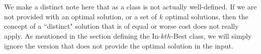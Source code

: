 \section{\inbk}
We make a distinct note here that \inbk{} as a class is not actually well-defined. If we are not provided with an optimal solution, or a set of $k$ optimal solutions, then the concept of a ``distinct" solution that is of equal or worse cost does not really apply. As mentioned in the section defining the In-$kth$-Best class, we will simply ignore the version that does not provide the optimal solution in the input.

